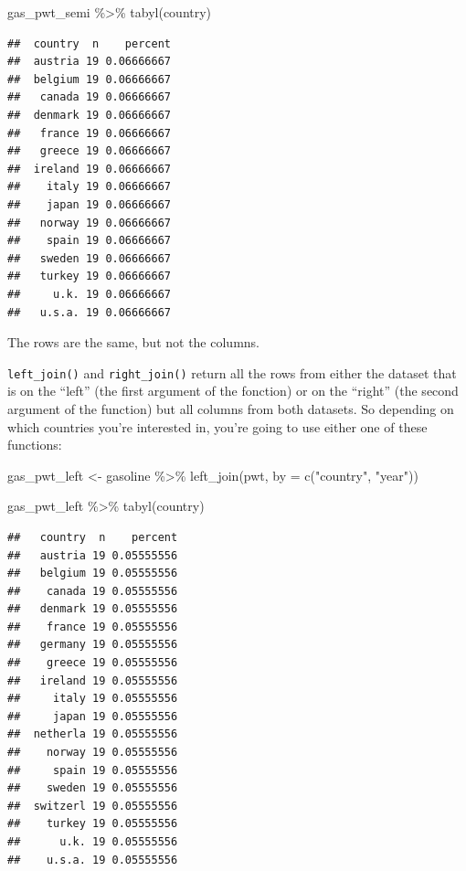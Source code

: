 \documentclass[
]{article}
\newenvironment{Shaded}{\begin{snugshade}}{\end{snugshade}}
\newcommand{\AttributeTok}[1]{\textcolor[rgb]{0.77,0.63,0.00}{#1}}
\newcommand{\FunctionTok}[1]{\textcolor[rgb]{0.00,0.00,0.00}{#1}}
\newcommand{\NormalTok}[1]{#1}
\newcommand{\OtherTok}[1]{\textcolor[rgb]{0.56,0.35,0.01}{#1}}
\newcommand{\SpecialCharTok}[1]{\textcolor[rgb]{0.00,0.00,0.00}{#1}}
\newcommand{\StringTok}[1]{\textcolor[rgb]{0.31,0.60,0.02}{#1}}
\begin{document}
\begin{Shaded}
\begin{Highlighting}[]
\NormalTok{gas\_pwt\_semi }\SpecialCharTok{\%\textgreater{}\%}
  \FunctionTok{tabyl}\NormalTok{(country)}
\end{Highlighting}
\end{Shaded}

\begin{verbatim}
##  country  n    percent
##  austria 19 0.06666667
##  belgium 19 0.06666667
##   canada 19 0.06666667
##  denmark 19 0.06666667
##   france 19 0.06666667
##   greece 19 0.06666667
##  ireland 19 0.06666667
##    italy 19 0.06666667
##    japan 19 0.06666667
##   norway 19 0.06666667
##    spain 19 0.06666667
##   sweden 19 0.06666667
##   turkey 19 0.06666667
##     u.k. 19 0.06666667
##   u.s.a. 19 0.06666667
\end{verbatim}

The rows are the same, but not the columns.

\texttt{left\_join()} and \texttt{right\_join()} return all the rows from either the dataset that is on the
``left'' (the first argument of the fonction) or on the ``right'' (the second argument of the
function) but all columns from both datasets. So depending on which countries you're interested in,
you're going to use either one of these functions:

\begin{Shaded}
\begin{Highlighting}[]
\NormalTok{gas\_pwt\_left }\OtherTok{\textless{}{-}}\NormalTok{ gasoline }\SpecialCharTok{\%\textgreater{}\%}
  \FunctionTok{left\_join}\NormalTok{(pwt, }\AttributeTok{by =} \FunctionTok{c}\NormalTok{(}\StringTok{"country"}\NormalTok{, }\StringTok{"year"}\NormalTok{))}

\NormalTok{gas\_pwt\_left }\SpecialCharTok{\%\textgreater{}\%}
  \FunctionTok{tabyl}\NormalTok{(country)}
\end{Highlighting}
\end{Shaded}

\begin{verbatim}
##   country  n    percent
##   austria 19 0.05555556
##   belgium 19 0.05555556
##    canada 19 0.05555556
##   denmark 19 0.05555556
##    france 19 0.05555556
##   germany 19 0.05555556
##    greece 19 0.05555556
##   ireland 19 0.05555556
##     italy 19 0.05555556
##     japan 19 0.05555556
##  netherla 19 0.05555556
##    norway 19 0.05555556
##     spain 19 0.05555556
##    sweden 19 0.05555556
##  switzerl 19 0.05555556
##    turkey 19 0.05555556
##      u.k. 19 0.05555556
##    u.s.a. 19 0.05555556
\end{verbatim}
\end{document}

